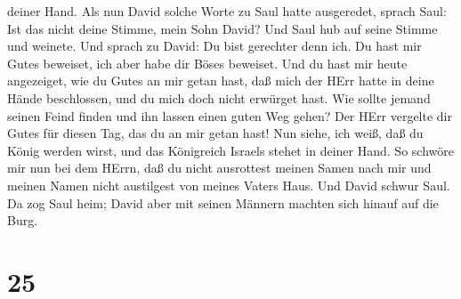 deiner Hand.  Als nun David solche Worte zu Saul hatte
ausgeredet, sprach Saul: Ist das nicht deine Stimme, mein Sohn David?
Und Saul hub auf seine Stimme und weinete.  Und sprach zu
David: Du bist gerechter denn ich. Du hast mir Gutes beweiset, ich aber
habe dir Böses beweiset.  Und du hast mir heute angezeiget,
wie du Gutes an mir getan hast, daß mich der HErr hatte in deine Hände
beschlossen, und du mich doch nicht erwürget hast.  Wie
sollte jemand seinen Feind finden und ihn lassen einen guten Weg gehen?
Der HErr vergelte dir Gutes für diesen Tag, das du an mir getan hast!
 Nun siehe, ich weiß, daß du König werden wirst, und das
Königreich Israels stehet in deiner Hand.  So schwöre mir
nun bei dem HErrn, daß du nicht ausrottest meinen Samen nach mir und
meinen Namen nicht austilgest von meines Vaters Haus.  Und
David schwur Saul. Da zog Saul heim; David aber mit seinen Männern
machten sich hinauf auf die Burg.

\hypertarget{section-24}{%
\section{25}\label{section-24}}

